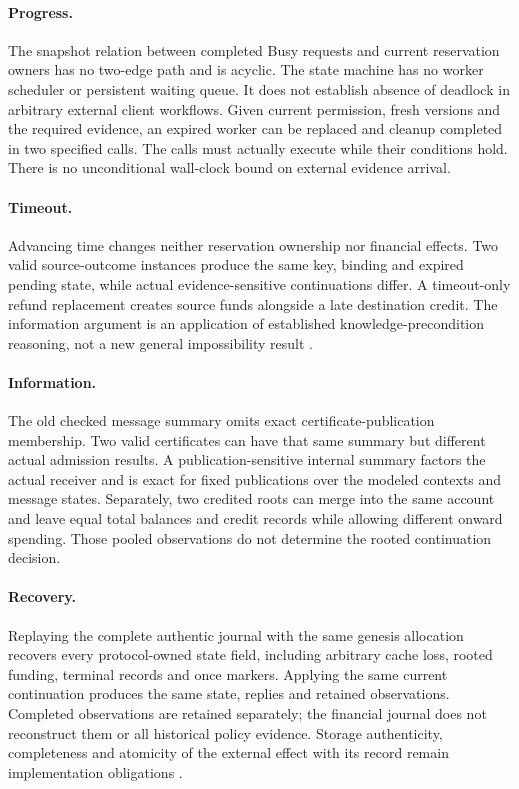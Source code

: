 \documentclass[11pt,a4paper]{article}
\begin{document}
\paragraph{Progress.}
The snapshot relation between completed Busy requests and current reservation
owners has no two-edge path and is acyclic. The state machine has no worker
scheduler or persistent waiting queue. It does not establish absence of
deadlock in arbitrary external client workflows. Given current permission,
fresh versions and the required evidence, an expired worker can be replaced
and cleanup completed in two specified calls. The calls must actually execute
while their conditions hold. There is no unconditional wall-clock bound on
external evidence arrival.

\paragraph{Timeout.}
Advancing time changes neither reservation ownership nor financial effects.
Two valid source-outcome instances produce the same key, binding and expired
pending state, while actual evidence-sensitive continuations differ. A
timeout-only refund replacement creates source funds alongside a late
destination credit. The information argument is an application of established
knowledge-precondition reasoning, not a new general impossibility result
\cite{moses,leases}.

\paragraph{Information.}
The old checked message summary omits exact certificate-publication
membership. Two valid certificates can have that same summary but different
actual admission results. A publication-sensitive internal summary factors
the actual receiver and is exact for fixed publications over the modeled
contexts and message states. Separately, two credited roots can merge into
the same account and leave equal total balances and credit records while
allowing different onward spending. Those pooled observations do not
determine the rooted continuation decision.

\paragraph{Recovery.}
Replaying the complete authentic journal with the same genesis allocation
recovers every protocol-owned state field, including arbitrary cache loss,
rooted funding, terminal records and once markers. Applying the same current
continuation produces the same state, replies and retained observations.
Completed observations are retained separately; the financial journal does
not reconstruct them or all historical policy evidence. Storage authenticity,
completeness and atomicity of the external effect with its record remain
implementation obligations \cite{persistence,graylamport}.
\end{document}
